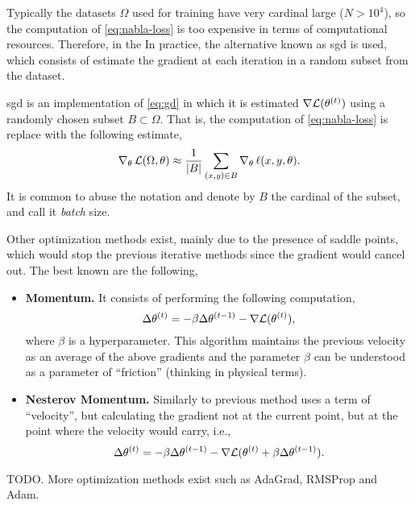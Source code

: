 Typically the datasets \(\Omega\) used for training have very cardinal large
(\(N > 10^4\)), so the computation of \vref{eq:nabla-loss} is too expensive in
terms of computational resources. Therefore, in the In practice, the
alternative known as \gls{sgd} is used, which consists of estimate the gradient
at each iteration in a random subset from the dataset.

\gls{sgd} is an implementation of \vref{eq:gd} in which it is estimated
\(\nabla \mathcal{L} (\theta^{(t)})\) using a randomly chosen subset
\(B \subset \Omega\). That is, the computation of \vref{eq:nabla-loss} is
replace with the following estimate,
\begin{equation}\label{eq:nabla-loss-sto}
  \nabla_{\theta}\,\mathcal{L}(\Omega, \theta) \approx
  \frac{1}{\lvert B\rvert} \sum_{(x, y) \in B} \nabla_{\theta}\,\ell (x, y, \theta).
\end{equation}
It is common to abuse the notation and denote by \(B\) the cardinal of the
subset, and call it \emph{batch} size.

Other optimization methods exist, mainly due to the presence of saddle points,
which would stop the previous iterative methods since the gradient would cancel
out. The best known are the following,
\begin{itemize}
  \item \textbf{Momentum.} It consists of performing the
  following computation,
  \begin{equation}
    \Delta\theta^{(t)} =
    -\beta\Delta\theta^{(t-1)} -\nabla\mathcal{L}(\theta^{(t)}),
  \end{equation}
  where \(\beta\) is a hyperparameter. This algorithm maintains the previous
  velocity as an average of the above gradients and the parameter \(\beta\) can
  be understood as a parameter of ``friction'' (thinking in physical terms).
  \item \textbf{Nesterov Momentum.} Similarly to
  previous method uses a term of ``velocity'', but calculating the gradient not
  at the current point, but at the point where the velocity would carry, i.e.,
  \begin{equation}
    \Delta\theta^{(t)} =
    -\beta\Delta\theta^{(t-1)} -\nabla\mathcal{L}(\theta^{(t)} +
    \beta\Delta\theta^{(t-1)}).
  \end{equation}
\end{itemize}

TODO. More optimization methods exist such as AdaGrad, RMSProp and Adam.

